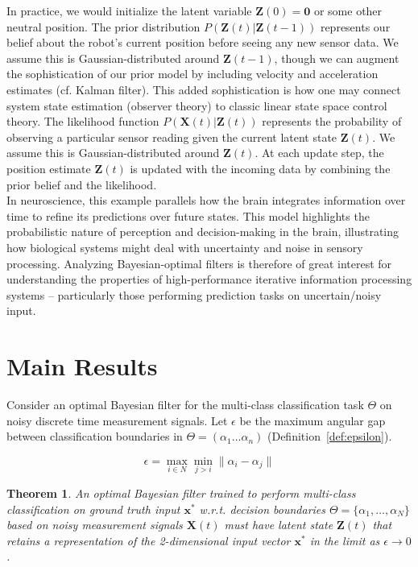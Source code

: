 \documentclass[12pt]{article}
\newtheorem{theorem}{Theorem}
\begin{document}
In practice, we would initialize the latent variable $\mathbf Z(0) = \mathbf 0$ or some other neutral position. 
The prior distribution $P(\mathbf Z(t) | \mathbf Z(t-1))$ represents our belief about the robot's current position before seeing any new sensor data. 
We assume this is Gaussian-distributed around $\mathbf Z(t-1)$, though we can augment the sophistication of our prior model by including velocity and acceleration estimates (cf. Kalman filter). 
This added sophistication is how one may connect system state estimation (observer theory) to classic linear state space control theory. 
The likelihood function $P(\mathbf X(t) | \mathbf Z(t))$ represents the probability of observing a particular sensor reading given the current latent state $\mathbf Z(t)$. 
We assume this is Gaussian-distributed around $\mathbf Z(t)$. 
At each update step, the position estimate $\mathbf Z(t)$ is updated with the incoming data by combining the prior belief and the likelihood. \\ 

In neuroscience, this example parallels how the brain integrates information over time to refine its predictions over future states. 
This model highlights the probabilistic nature of perception and decision-making in the brain, illustrating how biological systems might deal with uncertainty and noise in sensory processing.
Analyzing Bayesian-optimal filters is therefore of great interest for understanding the properties of high-performance iterative information processing systems -- particularly those performing prediction tasks on uncertain/noisy input.


\section{Main Results}
\label{sec:main}

Consider an optimal Bayesian filter for the multi-class classification task
$\Theta$ on noisy discrete time measurement signals. 
Let $\epsilon$ be the maximum angular gap between classification boundaries in $\Theta=(\alpha_1 \dots \alpha_n)$ (Definition~\ref{def:epsilon}).

\begin{equation}
	\label{def:epsilon}
	\epsilon = \max_{i \in N} \min_{j > i} \| \alpha_i - \alpha_j \|
\end{equation}

\begin{theorem}
	\label{thm:main}
	An optimal Bayesian filter trained to perform multi-class classification on
	ground truth input $\mathbf x^*$ w.r.t. decision boundaries 
	$\Theta = \{\alpha_1, \dots, \alpha_N\}$ based on noisy measurement signals
	$\mathbf X(t)$ must have latent state $\mathbf Z(t)$ that retains a
	representation of the 2-dimensional input vector $\mathbf x^*$ in the limit 
	as $\epsilon \to 0$. 
\end{theorem}
\end{document}
